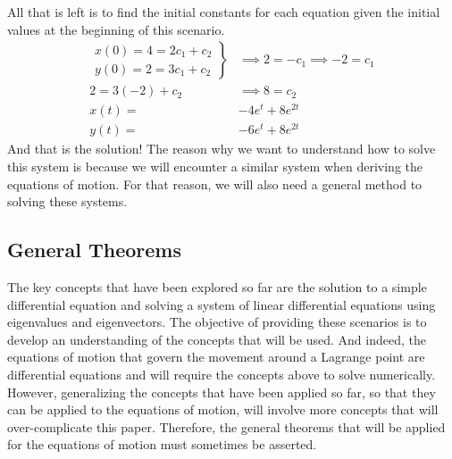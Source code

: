 \documentclass[12pt]{article}
\begin{document}
	All that is left is to find the initial constants for each equation given the initial values at the beginning of this scenario.
	\begin{align}
		\left. \begin{array}{l}
			x(0) = 4 = 2c_1 + c_2 \\
			y(0) = 2 = 3c_1 + c_2
		\end{array} \right\}
		&\implies 2 = -c_1 \implies -2 = c_1 \nonumber \\
		2 = 3(-2) + c_2 &\implies 8 = c_2 \nonumber \\
		x(t) =& -4e^t + 8e^{2t} \\
		y(t) =& -6e^t + 8e^{2t} 
	\end{align}
	And that is the solution!
	The reason why we want to understand how to solve this system is because we will encounter a similar system when deriving the equations of motion.
	For that reason, we will also need a general method to solving these systems.
	
	\subsection{General Theorems}
	
	The key concepts that have been explored so far are the solution to a simple differential equation and solving a system of linear differential equations using eigenvalues and eigenvectors.
	The objective of providing these scenarios is to develop an understanding of the concepts that will be used.
	And indeed, the equations of motion that govern the movement around a Lagrange point are differential equations and will require the concepts above to solve numerically.
	However, generalizing the concepts that have been applied so far, so that they can be applied to the equations of motion, will involve more concepts that will over-complicate this paper.
	Therefore, the general theorems that will be applied for the equations of motion must sometimes be asserted.
	
\end{document}
